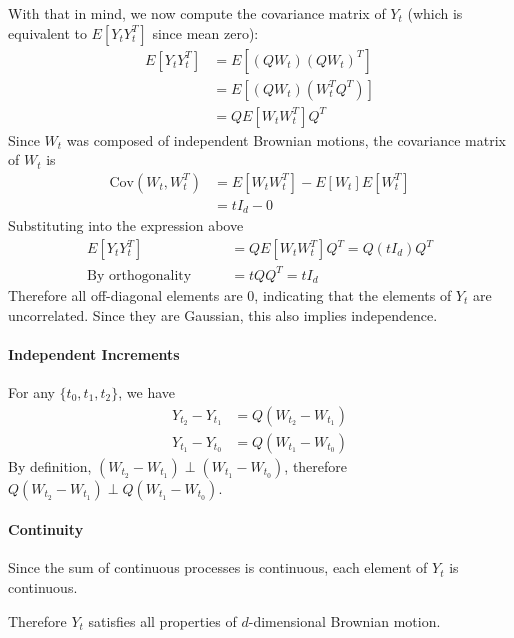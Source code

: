 \documentclass[12pt]{article}
\theoremstyle{plain}
\theoremstyle{definition}
\theoremstyle{remark}
\begin{document}
\begin{enumerate}
    With that in mind, we now compute the covariance matrix of $Y_t$
    (which is equivalent to $E[Y_tY^T_t]$ since mean zero):
    \begin{align*}
      E\left[Y_t Y^T_t\right]
      &= E\left[
        \left(Q W_t\right)
        \left(QW_t\right)^T
      \right] \\
      &= E\left[
        \left(Q W_t\right)
        \left(W^T_t Q^T\right)
      \right] \\
      &= QE\left[
        W_t
        W^T_t\right] Q^T
    \end{align*}
    Since $W_t$ was composed of independent Brownian motions, the
    covariance matrix of $W_t$ is
    \begin{align*}
      \text{Cov}(W_t,W^T_t)
        &= E[W_tW^T_t] - E[W_t] E[W^T_t]\\
        &= tI_d - 0
    \end{align*}
    Substituting into the expression above
    \begin{align*}
      E\left[Y_t Y^T_t\right]
      &= QE\left[
        W_t W^T_t
        \right] Q^T
      = Q
        \left(t I_d\right)
        Q^T \\
      \text{By orthogonality} \qquad
      &= t Q Q^T = t I_d
    \end{align*}
    Therefore all off-diagonal elements are 0, indicating that the
    elements of $Y_t$ are uncorrelated. Since they are Gaussian, this
    also implies independence.

    \paragraph{Independent Increments}
    For any $\{t_0,t_1,t_2\}$, we have
    \begin{align*}
      Y_{t_2} - Y_{t_1} &= Q (W_{t_2} - W_{t_1})\\
      Y_{t_1} - Y_{t_0} &= Q (W_{t_1} - W_{t_0})
    \end{align*}
    By definition, $(W_{t_2}-W_{t_1}) \perp (W_{t_1}-W_{t_0})$,
    therefore $Q(W_{t_2}-W_{t_1}) \perp Q(W_{t_1}-W_{t_0})$.

    \paragraph{Continuity}
    Since the sum of continuous processes is continuous, each element of
    $Y_t$ is continuous.

    Therefore $Y_t$ satisfies all properties of $d$-dimensional Brownian
    motion.


\end{enumerate}
\end{document}
